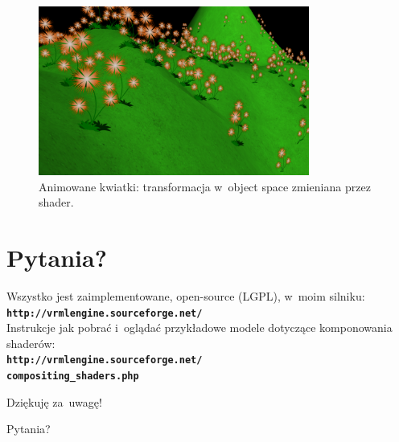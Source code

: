 \documentclass{beamer}
\begin{document}
\begin{frame}
\begin{figure}
  \centering
  \includegraphics[width=3.5in]{../flowers}
  \caption{Animowane kwiatki: transformacja w~object space zmieniana przez shader.}
\end{figure}
\end{frame}

\section{Pytania?}

\begin{frame}[t]

\begin{center}
{\small
Wszystko jest zaimplementowane, open-source (LGPL), w~moim silniku:\\
{\color{blue} \textbf{\texttt{http://vrmlengine.sourceforge.net/}}}\\
Instrukcje jak pobrać i~oglądać przykładowe modele dotyczące komponowania
shaderów:\\
{\color{blue} \textbf{\texttt{http://vrmlengine.sourceforge.net/\\
compositing\_shaders.php}}}}
\end{center}

\vspace{0.25in}

\begin{center}
{\Large Dziękuję za~uwagę!}
\end{center}


\begin{center}
{\Huge \alert{Pytania?}}
\end{center}

\end{frame}
\end{document}
